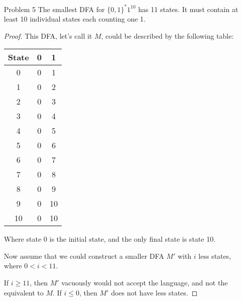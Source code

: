 \documentclass[12pt,letterpaper]{article}
\begin{document}
\begin{enumerate}
\begin{proof}
        Given some accepting DFA $M$ for $L$ and the fact that DFA's are closed under concatenation, we can decompose $M$ into smaller DFA's of a single character.
        I.e. $M = M_1M_2 \cdots M_n$.
        We can also construct a DFA $M_0$ that accepts the singleton $\{0\}$.
        Now we can intersperse $M_0$ through our decomposed $M$.
        We end up with $M' = M_1M_0M_2M_0 \cdots M_nM_0$.

        And since DFA-acceptable languages are closed under concatenation.
        Our new machine is an accepting DFA.

        If we define $\mathcal{Z}$ as this deconstruction/reconstruction operation,
        then we see that DFA-acceptable languages are closed under $\mathcal{Z}$.
      \end{proof}

    \pagebreak

    \item[Problem 5]
      The smallest DFA for $\{0,1\}^*{1^10}$ has 11 states.
      It must contain at least 10 individual states each counting one 1.

      \begin{proof}
        This DFA, let's call it $M$, could be described by the following table:

        \begin{tabular}{c | c | c}
          State & 0 & 1 \\
          \hline
          0   & 0 & 1   \\
          1   & 0 & 2   \\
          2   & 0 & 3   \\
          3   & 0 & 4   \\
          4   & 0 & 5   \\
          5   & 0 & 6   \\
          6   & 0 & 7   \\
          7   & 0 & 8   \\
          8   & 0 & 9   \\
          9   & 0 & 10  \\
          10  & 0 & 10
        \end{tabular}

        Where state 0 is the initial state, and the only final state is state 10.

        Now assume that we could construct a smaller DFA $M'$ with $i$ less states, where $0 < i < 11$.

        If $i \ge 11$, then $M'$ vacuously would not accept the language, and not the equivalent to $M$.
        If $i \le 0$, then $M'$ does not have less states.


\end{proof}
\end{enumerate}
\end{document}
